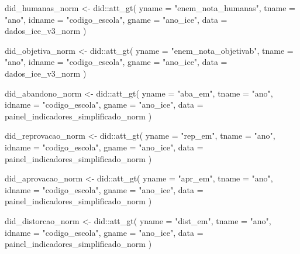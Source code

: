 \documentclass[
  letterpaper,
  DIV=11,
  numbers=noendperiod]{scrartcl}
\newenvironment{Shaded}{\begin{snugshade}}{\end{snugshade}}
\newcommand{\AttributeTok}[1]{\textcolor[rgb]{0.40,0.45,0.13}{#1}}
\newcommand{\FunctionTok}[1]{\textcolor[rgb]{0.28,0.35,0.67}{#1}}
\newcommand{\NormalTok}[1]{\textcolor[rgb]{0.00,0.23,0.31}{#1}}
\newcommand{\OtherTok}[1]{\textcolor[rgb]{0.00,0.23,0.31}{#1}}
\newcommand{\SpecialCharTok}[1]{\textcolor[rgb]{0.37,0.37,0.37}{#1}}
\newcommand{\StringTok}[1]{\textcolor[rgb]{0.13,0.47,0.30}{#1}}
\begin{document}
\begin{Shaded}
\begin{Highlighting}[]
\NormalTok{did\_humanas\_norm }\OtherTok{\textless{}{-}}\NormalTok{ did}\SpecialCharTok{::}\FunctionTok{att\_gt}\NormalTok{(}
  \AttributeTok{yname =} \StringTok{"enem\_nota\_humanas"}\NormalTok{,}
  \AttributeTok{tname =} \StringTok{"ano"}\NormalTok{,}
  \AttributeTok{idname =} \StringTok{"codigo\_escola"}\NormalTok{,}
  \AttributeTok{gname =} \StringTok{"ano\_ice"}\NormalTok{,}
  \AttributeTok{data =}\NormalTok{ dados\_ice\_v3\_norm}
\NormalTok{)}

\NormalTok{did\_objetiva\_norm }\OtherTok{\textless{}{-}}\NormalTok{ did}\SpecialCharTok{::}\FunctionTok{att\_gt}\NormalTok{(}
  \AttributeTok{yname =} \StringTok{"enem\_nota\_objetivab"}\NormalTok{,}
  \AttributeTok{tname =} \StringTok{"ano"}\NormalTok{,}
  \AttributeTok{idname =} \StringTok{"codigo\_escola"}\NormalTok{,}
  \AttributeTok{gname =} \StringTok{"ano\_ice"}\NormalTok{,}
  \AttributeTok{data =}\NormalTok{ dados\_ice\_v3\_norm}
\NormalTok{)}
\end{Highlighting}
\end{Shaded}

\begin{Shaded}
\begin{Highlighting}[]
\NormalTok{did\_abandono\_norm }\OtherTok{\textless{}{-}}\NormalTok{ did}\SpecialCharTok{::}\FunctionTok{att\_gt}\NormalTok{(}
  \AttributeTok{yname =} \StringTok{"aba\_em"}\NormalTok{,}
  \AttributeTok{tname =} \StringTok{"ano"}\NormalTok{,}
  \AttributeTok{idname =} \StringTok{"codigo\_escola"}\NormalTok{,}
  \AttributeTok{gname =} \StringTok{"ano\_ice"}\NormalTok{,}
  \AttributeTok{data =}\NormalTok{ painel\_indicadores\_simplificado\_norm}
\NormalTok{)}

\NormalTok{did\_reprovacao\_norm }\OtherTok{\textless{}{-}}\NormalTok{ did}\SpecialCharTok{::}\FunctionTok{att\_gt}\NormalTok{(}
  \AttributeTok{yname =} \StringTok{"rep\_em"}\NormalTok{,}
  \AttributeTok{tname =} \StringTok{"ano"}\NormalTok{,}
  \AttributeTok{idname =} \StringTok{"codigo\_escola"}\NormalTok{,}
  \AttributeTok{gname =} \StringTok{"ano\_ice"}\NormalTok{,}
  \AttributeTok{data =}\NormalTok{ painel\_indicadores\_simplificado\_norm}
\NormalTok{)}

\NormalTok{did\_aprovacao\_norm }\OtherTok{\textless{}{-}}\NormalTok{ did}\SpecialCharTok{::}\FunctionTok{att\_gt}\NormalTok{(}
  \AttributeTok{yname =} \StringTok{"apr\_em"}\NormalTok{,}
  \AttributeTok{tname =} \StringTok{"ano"}\NormalTok{,}
  \AttributeTok{idname =} \StringTok{"codigo\_escola"}\NormalTok{,}
  \AttributeTok{gname =} \StringTok{"ano\_ice"}\NormalTok{,}
  \AttributeTok{data =}\NormalTok{ painel\_indicadores\_simplificado\_norm}
\NormalTok{)}

\NormalTok{did\_distorcao\_norm }\OtherTok{\textless{}{-}}\NormalTok{ did}\SpecialCharTok{::}\FunctionTok{att\_gt}\NormalTok{(}
  \AttributeTok{yname =} \StringTok{"dist\_em"}\NormalTok{,}
  \AttributeTok{tname =} \StringTok{"ano"}\NormalTok{,}
  \AttributeTok{idname =} \StringTok{"codigo\_escola"}\NormalTok{,}
  \AttributeTok{gname =} \StringTok{"ano\_ice"}\NormalTok{,}
  \AttributeTok{data =}\NormalTok{ painel\_indicadores\_simplificado\_norm}
\NormalTok{)}
\end{Highlighting}
\end{Shaded}
\end{document}

